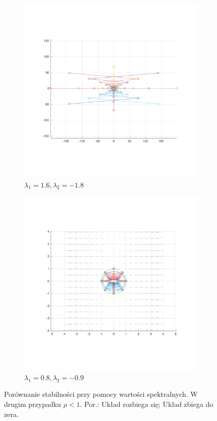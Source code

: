 \documentclass[]{article}
\begin{document}
\begin{figure}[H]
	\centering
	\begin{subfigure}{.5\textwidth}
		\centering
		\includegraphics[width=0.99\linewidth]{normal_16_-18}
		\caption{$\lambda_1 = 1.6, \lambda_2 = -1.8$}
		\label{fig:normal1}
	\end{subfigure}%
	\begin{subfigure}{.5\textwidth}
		\centering
		\includegraphics[width=0.99\linewidth]{normal_08_-09}
		\caption{$\lambda_1 = 0.8, \lambda_2 = -0.9$}
		\label{fig:normal2}
	\end{subfigure}
	\caption{Porównanie stabilności przy pomocy wartości spektralnych. W drugim przypadku $\rho < 1$. Por.: Układ rozbiega się; Układ zbiega do zera.}
	\label{fig2}
\end{figure}
\end{document}
